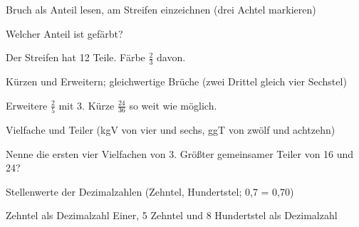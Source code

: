 \setcounter{aufgabe}{0}

\begin{aufgabe}{Bruch als Anteil lesen, am Streifen einzeichnen (drei Achtel markieren)}
\begin{teile}
\teil Welcher Anteil ist gefärbt?

\leerfeld
\teil Der Streifen hat 12 Teile. Färbe $\frac{2}{3}$ davon.

\end{teile}
\end{aufgabe}

\begin{aufgabe}{Kürzen und Erweitern; gleichwertige Brüche (zwei Drittel gleich vier Sechstel)}
\begin{teile}
\teil Erweitere $\frac{2}{5}$ mit 3.
\teil Kürze $\frac{24}{36}$ so weit wie möglich.
\end{teile}
\end{aufgabe}

\begin{aufgabe}{Vielfache und Teiler (kgV von vier und sechs, ggT von zwölf und achtzehn)}
\begin{teile}
\teil Nenne die ersten vier Vielfachen von 3.
\teil Größter gemeinsamer Teiler von 16 und 24?
\end{teile}
\end{aufgabe}

\begin{aufgabe}{Stellenwerte der Dezimalzahlen (Zehntel, Hundertstel; 0,7 = 0,70)}
\begin{teile}
 Zehntel als Dezimalzahl
 Einer, 5 Zehntel und 8 Hundertstel als Dezimalzahl
\end{teile}
\end{aufgabe}

